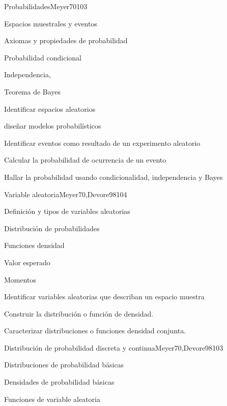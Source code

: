 \begin{syllabus}
\begin{unit}{Probabilidades}{Meyer70}{10}{3}
\begin{topics}
      \item Espacios muestrales y eventos
      \item Axiomas y propiedades de probabilidad
      \item Probabilidad condicional
      \item Independencia,
      \item Teorema de Bayes
   \end{topics}
   \begin{learningoutcomes}
      \item Identificar espacios aleatorios
      \item diseñar  modelos probabilísticos
      \item Identificar eventos como resultado de un experimento aleatorio
      \item Calcular la probabilidad de ocurrencia de un evento
      \item Hallar la probabilidad usando condicionalidad, independencia y Bayes
   \end{learningoutcomes}
\end{unit}

\begin{unit}{Variable aleatoria}{Meyer70,Devore98}{10}{4}
\begin{topics}
      \item Definición y tipos de variables aleatorias
      \item Distribución de probabilidades
      \item Funciones densidad
      \item Valor esperado
      \item Momentos
   \end{topics}

   \begin{learningoutcomes}
      \item Identificar variables aleatorias que describan un espacio muestra
      \item Construir la distribución o función de densidad.
      \item Caracterizar distribuciones o funciones densidad conjunta.
   \end{learningoutcomes}
\end{unit}

\begin{unit}{Distribución de probabilidad discreta y continua}{Meyer70,Devore98}{10}{3}
\begin{topics}
      \item Distribuciones de probabilidad básicas
      \item Densidades de probabilidad básicas
      \item Funciones de variable aleatoria
   \end{topics}


\end{unit}
\end{syllabus}
